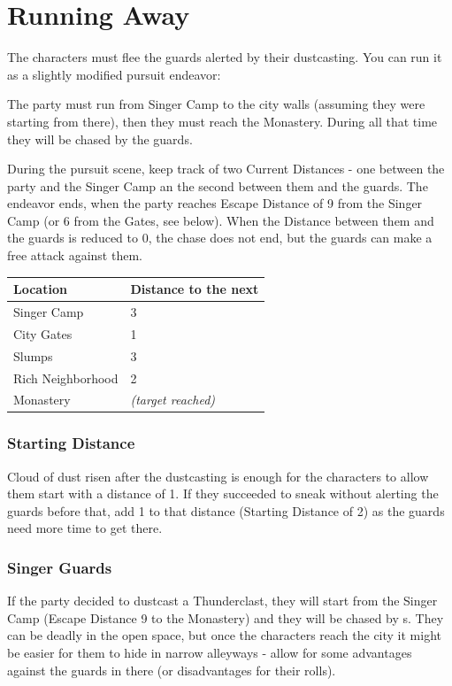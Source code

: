 \section{Running Away}
\label{sec:dustcastingFlee}

The characters must flee the guards alerted by their dustcasting. You can run it as a slightly modified pursuit endeavor:

The party must run from Singer Camp to the city walls (assuming they were starting from there), then they must reach the Monastery. During all that time they will be chased by the guards.

During the pursuit scene, keep track of two Current Distances - one between the party and the Singer Camp an the second between them and the guards. The endeavor ends, when the party reaches Escape Distance of 9 from the Singer Camp (or 6 from the Gates, see below). When the Distance between them and the guards is reduced to 0, the chase does not end, but the guards can make a free attack against them.

\begin{tabular}{p{3cm} p{4cm}}
	\color{black} Location 			& \color{black} Distance to the next \\ \hline
	\color{black} Singer Camp 		& \color{black} 3 \\
	\color{black} City Gates 		& \color{black} 1 \\
	\color{black} Slumps			& \color{black} 3 \\
	\color{black} Rich Neighborhood & \color{black} 2 \\
	\color{black} Monastery 		& \color{black} \textit{(target reached)}
\end{tabular}

\subsubsection{Starting Distance}

Cloud of dust risen after the dustcasting is enough for the characters to allow them start with a distance of 1. If they succeeded to sneak without alerting the guards before that, add 1 to that distance (Starting Distance of 2) as the guards need more time to get there.

\subsubsection{Singer Guards}

If the party decided to dustcast a Thunderclast, they will start from the Singer Camp (Escape Distance 9 to the Monastery) and they will be chased by \enemySingerHaevenlyOne{}s. They can be deadly in the open space, but once the characters reach the city it might be easier for them to hide in narrow alleyways - allow for some advantages against the guards in there (or disadvantages for their rolls).

